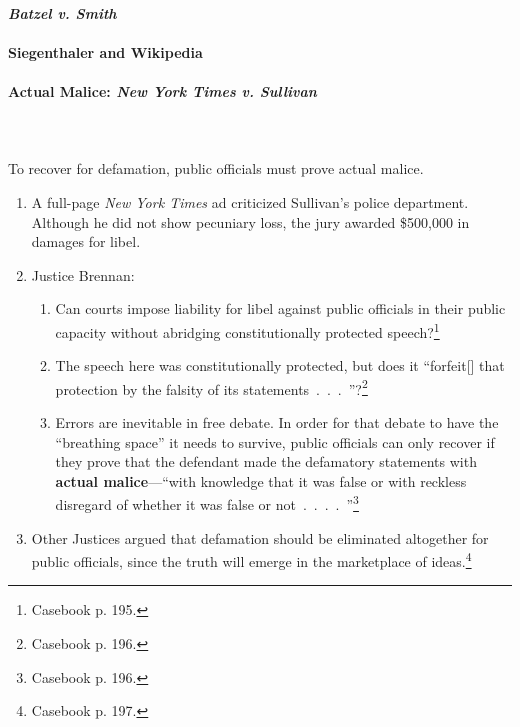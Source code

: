 \paragraph{\emph{Batzel v. Smith}}


\paragraph{Siegenthaler and Wikipedia}


\paragraph{Actual Malice: \emph{New York Times v. Sullivan}}
~\\\\
To recover for defamation, public officials must prove actual malice.

\begin{enumerate}
    \item A full-page \emph{New York Times} ad criticized Sullivan's police 
    department. Although he did not show pecuniary loss, the jury awarded 
    \$500,000 in damages for libel.
    \item Justice Brennan:
    \begin{enumerate}
        \item Can courts impose liability for libel against public officials in 
        their public capacity without abridging constitutionally protected 
        speech?\footnote{Casebook p. 195.}
        \item The speech here was constitutionally protected, but does it 
        ``forfeit[] that protection by the falsity of its 
        statements~.~.~.~''?\footnote{Casebook p. 196.}
        \item Errors are inevitable in free debate. In order for that debate to 
        have the ``breathing space'' it needs to survive, public officials can 
        only recover if they prove that the defendant made the defamatory 
        statements with \textbf{actual malice}---``with knowledge that it was 
        false or with reckless disregard of whether it was false or 
        not~.~.~.~.~''\footnote{Casebook p. 196.}
    \end{enumerate}
    \item Other Justices argued that defamation should be eliminated altogether 
    for public officials, since the truth will emerge in the marketplace of 
    ideas.\footnote{Casebook p. 197.}
\end{enumerate}

